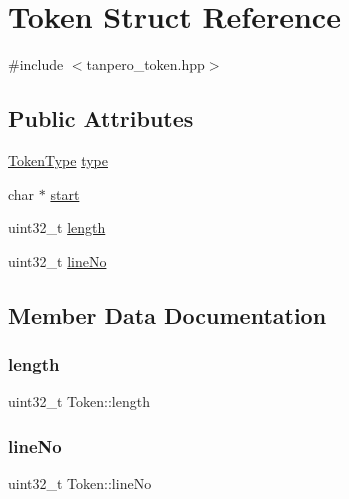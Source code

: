\hypertarget{struct_token}{}\section{Token Struct Reference}
\label{struct_token}


{\ttfamily \#include $<$tanpero\+\_\+token.\+hpp$>$}

\subsection*{Public Attributes}
\begin{DoxyCompactItemize}
\item 
\mbox{\hyperlink{tanpero__token_8hpp_aa520fbf142ba1e7e659590c07da31921}{Token\+Type}} \mbox{\hyperlink{struct_token_a67919af9f3a80dc0b28a0ab1e6d5bf8a}{type}}
\item 
char $\ast$ \mbox{\hyperlink{struct_token_aae86cfd04a8ccea10a0267272beab3e3}{start}}
\item 
uint32\+\_\+t \mbox{\hyperlink{struct_token_ae30178ccb3722c76d826e2ddf6bcbdbb}{length}}
\item 
uint32\+\_\+t \mbox{\hyperlink{struct_token_ab690735e8e01a7acfbf77d9bfd6a8a03}{line\+No}}
\end{DoxyCompactItemize}


\subsection{Member Data Documentation}
\mbox{\label{struct_token_ae30178ccb3722c76d826e2ddf6bcbdbb}} 
\subsubsection{\texorpdfstring{length}{length}}
{\footnotesize\ttfamily uint32\+\_\+t Token\+::length}

\mbox{\label{struct_token_ab690735e8e01a7acfbf77d9bfd6a8a03}} 
\subsubsection{\texorpdfstring{lineNo}{lineNo}}
{\footnotesize\ttfamily uint32\+\_\+t Token\+::line\+No}

\mbox{\label{struct_token_aae86cfd04a8ccea10a0267272beab3e3}} 
